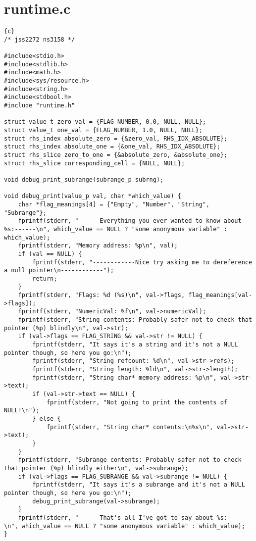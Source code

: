 \section{runtime.c}
\begin{lstlisting}{c}
/* jss2272 ns3158 */

#include<stdio.h>
#include<stdlib.h>
#include<math.h>
#include<sys/resource.h>
#include<string.h>
#include<stdbool.h>
#include "runtime.h"

struct value_t zero_val = {FLAG_NUMBER, 0.0, NULL, NULL};
struct value_t one_val = {FLAG_NUMBER, 1.0, NULL, NULL};
struct rhs_index absolute_zero = {&zero_val, RHS_IDX_ABSOLUTE};
struct rhs_index absolute_one = {&one_val, RHS_IDX_ABSOLUTE};
struct rhs_slice zero_to_one = {&absolute_zero, &absolute_one};
struct rhs_slice corresponding_cell = {NULL, NULL};

void debug_print_subrange(subrange_p subrng);

void debug_print(value_p val, char *which_value) {
	char *flag_meanings[4] = {"Empty", "Number", "String", "Subrange"};
	fprintf(stderr, "------Everything you ever wanted to know about %s:------\n", which_value == NULL ? "some anonymous variable" : which_value);
	fprintf(stderr, "Memory address: %p\n", val);
	if (val == NULL) {
		fprintf(stderr, "------------Nice try asking me to dereference a null pointer\n------------");
		return;
	}
	fprintf(stderr, "Flags: %d (%s)\n", val->flags, flag_meanings[val->flags]);
	fprintf(stderr, "NumericVal: %f\n", val->numericVal);
	fprintf(stderr, "String contents: Probably safer not to check that pointer (%p) blindly\n", val->str);
	if (val->flags == FLAG_STRING && val->str != NULL) {
		fprintf(stderr, "It says it's a string and it's not a NULL pointer though, so here you go:\n");
		fprintf(stderr, "String refcount: %d\n", val->str->refs);
		fprintf(stderr, "String length: %ld\n", val->str->length);
		fprintf(stderr, "String char* memory address: %p\n", val->str->text);
		if (val->str->text == NULL) {
			fprintf(stderr, "Not going to print the contents of NULL!\n");
		} else {
			fprintf(stderr, "String char* contents:\n%s\n", val->str->text);
		}
	}
	fprintf(stderr, "Subrange contents: Probably safer not to check that pointer (%p) blindly either\n", val->subrange);
	if (val->flags == FLAG_SUBRANGE && val->subrange != NULL) {
		fprintf(stderr, "It says it's a subrange and it's not a NULL pointer though, so here you go:\n");
		debug_print_subrange(val->subrange);
	}
	fprintf(stderr, "------That's all I've got to say about %s:------\n", which_value == NULL ? "some anonymous variable" : which_value);
}


\end{lstlisting}
